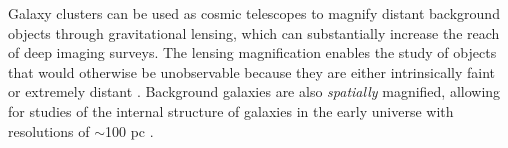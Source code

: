Galaxy clusters can be used as cosmic telescopes to magnify distant
background objects through gravitational lensing, which can
substantially increase the reach of deep imaging surveys.  The lensing
magnification enables the study of objects that would otherwise be
unobservable because they are either intrinsically
faint \citep[e.g.][]{Schenker:2012,Alavi:2014} or extremely
distant \citep[e.g.][]{Franx:1997,Ellis:2001,Hu:2002,Kneib:2004,Richard:2006,Richard:2008,Bouwens:2009a,Maizy:2010,Zheng:2012,Coe:2013,Bouwens:2014,Zitrin:2014b}.
Background galaxies are also {\it spatially} magnified, allowing for
studies of the internal structure of galaxies in the early universe
with resolutions of $\sim$100
pc \citep[e.g.][]{Stark:2008,Jones:2010,Yuan:2011,Wuyts:2014,Livermore:2015}.

